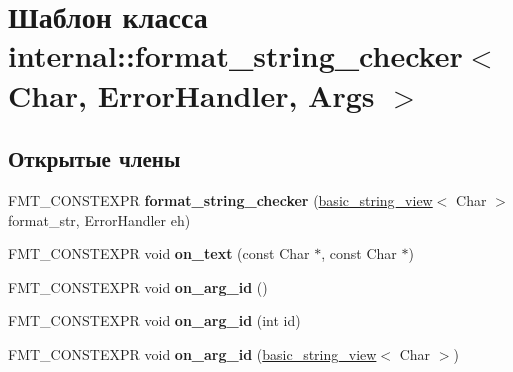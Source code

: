 \hypertarget{classinternal_1_1format__string__checker}{}\section{Шаблон класса internal\+:\+:format\+\_\+string\+\_\+checker$<$ Char, Error\+Handler, Args $>$}
\label{classinternal_1_1format__string__checker}
\subsection*{Открытые члены}
\begin{DoxyCompactItemize}
\item 
\mbox{\label{classinternal_1_1format__string__checker_ace9b5d14d17800788cb39fcfe900712d}} 
F\+M\+T\+\_\+\+C\+O\+N\+S\+T\+E\+X\+PR {\bfseries format\+\_\+string\+\_\+checker} (\hyperlink{classbasic__string__view}{basic\+\_\+string\+\_\+view}$<$ Char $>$ format\+\_\+str, Error\+Handler eh)
\item 
\mbox{\label{classinternal_1_1format__string__checker_a80292d0556871811a821bca796f770c3}} 
F\+M\+T\+\_\+\+C\+O\+N\+S\+T\+E\+X\+PR void {\bfseries on\+\_\+text} (const Char $\ast$, const Char $\ast$)
\item 
\mbox{\label{classinternal_1_1format__string__checker_aa885efcd3d9786997df78121b82b85a2}} 
F\+M\+T\+\_\+\+C\+O\+N\+S\+T\+E\+X\+PR void {\bfseries on\+\_\+arg\+\_\+id} ()
\item 
\mbox{\label{classinternal_1_1format__string__checker_a78c7011208271c7132cdad9986f30652}} 
F\+M\+T\+\_\+\+C\+O\+N\+S\+T\+E\+X\+PR void {\bfseries on\+\_\+arg\+\_\+id} (int id)
\item 
\mbox{\label{classinternal_1_1format__string__checker_a32971d1bbff2686a400f2edba4473d8a}} 
F\+M\+T\+\_\+\+C\+O\+N\+S\+T\+E\+X\+PR void {\bfseries on\+\_\+arg\+\_\+id} (\hyperlink{classbasic__string__view}{basic\+\_\+string\+\_\+view}$<$ Char $>$)
\item 
\mbox{\label{classinternal_1_1format__string__checker_a0d7bcf166939fea3198891cd0e574997}} 

\end{DoxyCompactItemize}

